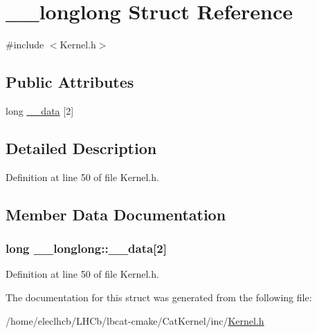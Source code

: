 \hypertarget{struct____longlong}{
\section{\_\-\_\-longlong Struct Reference}
\label{struct____longlong}
}


{\ttfamily \#include $<$Kernel.h$>$}\subsection*{Public Attributes}
\begin{DoxyCompactItemize}
\item 
long \hyperlink{struct____longlong_a1ba8dd2a7c85529d3ce8b635d02298d1}{\_\-\_\-data} \mbox{[}2\mbox{]}
\end{DoxyCompactItemize}


\subsection{Detailed Description}


Definition at line 50 of file Kernel.h.

\subsection{Member Data Documentation}
\hypertarget{struct____longlong_a1ba8dd2a7c85529d3ce8b635d02298d1}{
\subsubsection[{\_\-\_\-data}]{\setlength{\rightskip}{0pt plus 5cm}long {\bf \_\-\_\-longlong::\_\-\_\-data}\mbox{[}2\mbox{]}}}
\label{struct____longlong_a1ba8dd2a7c85529d3ce8b635d02298d1}


Definition at line 50 of file Kernel.h.

The documentation for this struct was generated from the following file:\begin{DoxyCompactItemize}
\item 
/home/eleclhcb/LHCb/lbcat-\/cmake/CatKernel/inc/\hyperlink{Kernel_8h}{Kernel.h}\end{DoxyCompactItemize}

